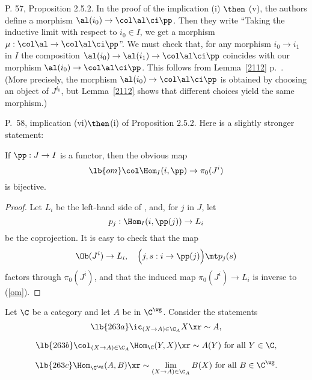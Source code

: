 \documentclass[12pt]{article}
\theoremstyle{remark}
\theoremstyle{definition}
\begin{document}
%

\begin{s}
P. 57, Proposition 2.5.2. In the proof of the implication (i) $\then$ (v), the authors define a morphism $\al(i_0)\to\col\al\ci\pp$. Then they write ``Taking the inductive limit with respect to $i_0\in I$, we get a morphism $\mu:\col\al\to\col\al\ci\pp$''. We must check that, for any morphism $i_0\to i_1$ in $I$ the composition $\al(i_0)\to\al(i_1)\to\col\al\ci\pp$ coincides with our morphism $\al(i_0)\to\col\al\ci\pp$. This follows from Lemma~\ref{2112} p.~. (More precisely, the morphism $\al(i_0)\to\col\al\ci\pp$ is obtained by choosing an object of $J^{i_0}$, but Lemma~\ref{2112} shows that different choices yield the same morphism.)
\end{s}
%

\begin{s} 
P.~58, implication (vi)$\then$(i) of Proposition 2.5.2. Here is a slightly stronger statement:

\begin{prop} 
If $\pp:J\to I$ is a functor, then the obvious map
%
\begin{equation}\lb{om}
\col\Hom_I(i,\pp)\to\pi_0(J^i)
\end{equation}
%
is bijective. 
\end{prop}

\begin{proof} 
Let $L_i$ be the left-hand side of , and, for $j$ in $J$, let 
$$
p_j:\Hom_I(i,\pp(j))\to L_i
$$
be the coprojection. It is easy to check that the map 
$$
\Ob(J^i)\to L_i,\quad\Big(j,s:i\to\pp(j)\Big)\mt p_j(s)
$$
factors through $\pi_0(J^i)$, and that the induced map $\pi_0(J^i)\to L_i$ is inverse to (\ref{om}).
\end{proof}
\end{s}

%


Let $\C$ be a category and let $A$ be in $\C^\wg$. Consider the statements
%
\begin{equation}\lb{263a}
\ic_{(X\to A)\in\C_A}X\xr\sim A,
\end{equation} 

\begin{equation}\lb{263b}
\col_{(X\to A)\in\C_A}\Hom_\C(Y,X)\xr\sim A(Y)\text{ for all }Y\in\C, 
\end{equation}

\begin{equation}\lb{263c}
\Hom_{\C^\wg}(A,B)\xr\sim\lim_{(X\to A)\in\C_A}B(X)\text{ for all }B\in\C^\wg. 
\end{equation}
\end{document}
